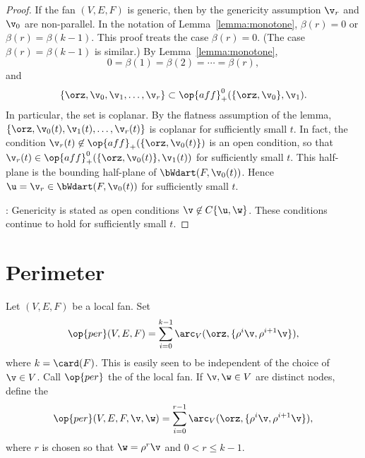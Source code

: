 \begin{proof}
If the fan $(V,E,F)$ is generic, then
by the genericity assumption $\v_r$ and
$\v_0$ are non-parallel.  In the notation of
Lemma~\ref{lemma:monotone}, $\beta(r) = 0$ or $\beta(r) =
\beta(k-1)$.  This proof treats the case $\beta(r)=0$. (The case
$\beta(r)=\beta(k-1)$ is similar.)  By Lemma~\ref{lemma:monotone},
\begin{displaymath}0=\beta(1)=\beta(2)=\cdots=\beta(r),\end{displaymath}
and 
\begin{displaymath}
\{\orz,\v_0,\v_1,\ldots,\v_r\} \subset \op{aff}^0_+(\{\orz,\v_0\},\v_1).
\end{displaymath}
In particular, the set is coplanar.  By the flatness assumption of
the lemma, $\{\orz,\v_0(t),\v_1(t),\ldots,\v_r(t)\}$ is coplanar for
sufficiently small $t$.  In fact, the condition $\v_r(t)\not\in
\op{aff}_+(\{\orz,\v_0(t)\})$ is an open condition, so that
$\v_r(t)\in \op{aff}^0_+(\{\orz,\v_0(t)\},\v_1(t))$ for sufficiently
small $t$.  This half-plane is the bounding half-plane of
$\bWdart(F,\v_0(t))$.  Hence $\u = \v_r\in \bWdart(F,\v_0(t))$ for
sufficiently small $t$.

: Genericity is stated as open conditions $\v\not\in
C\{\u,\w\}$.  These conditions continue to hold for sufficiently small
$t$.
\end{proof}






\section{Perimeter}


\begin{definition}[perimeter]\label{lemma:perim}
Let $(V,E,F)$ be a local fan.    Set
\begin{displaymath}
  \op{per}(V,E,F) 
= \sum_{i=0}^{k-1} \arc_V(\orz,\{\rho^i \v,\rho^{i+1} \v\}), 
\end{displaymath}
where $k=\card(F)$.  This is easily seen to be independent of the
choice of $\v\in V$.  Call $\op{per}$ the  of the local fan.
If $\v,\w\in V$ are distinct nodes, define the 
\begin{displaymath}
  \op{per}(V,E,F,\v,\w) 
= \sum_{i=0}^{r-1} \arc_V(\orz,\{\rho^i \v,\rho^{i+1} \v\}), 
\end{displaymath}
where $r$ is chosen so that $\w=\rho^r \v$ and $0<r\le k-1$.
\end{definition}
%
%
%



